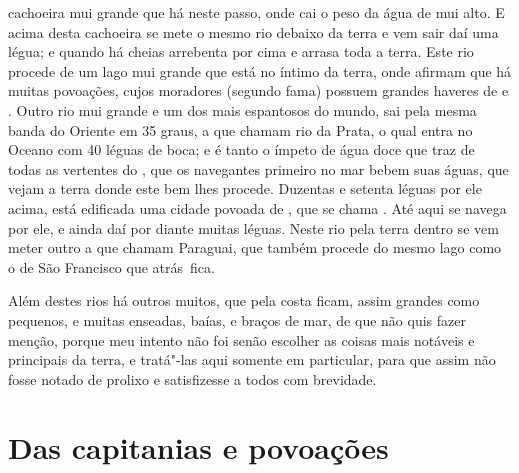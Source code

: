 cachoeira mui grande que há neste passo, onde cai o peso da água de mui
alto. E acima desta cachoeira se mete o mesmo rio debaixo da terra e
vem sair daí uma légua; e quando há cheias arrebenta por cima e arrasa
toda a terra. Este rio procede de um lago mui grande que está no íntimo
da terra, onde afirmam que há muitas povoações, cujos moradores
(segundo fama) possuem grandes haveres de  e . Outro rio
mui grande e um dos mais espantosos do mundo, sai pela mesma banda do
Oriente em 35 graus, a que chamam rio da Prata, o qual					%
entra no Oceano com 40 léguas de boca; e é tanto o ímpeto de água
doce que traz de todas as vertentes do , que os navegantes primeiro no mar
bebem suas águas, que vejam a terra donde este bem lhes procede.
Duzentas e setenta léguas por ele acima, está edificada uma cidade
povoada de , que se chama .  Até aqui se navega por
ele, e ainda daí  por diante muitas léguas. Neste rio pela terra dentro
se vem meter outro a que chamam Paraguai, que também procede do mesmo			%
lago como o de São Francisco que \mbox{atrás fica.}

Além destes rios há outros muitos, que pela costa ficam, assim grandes
como pequenos, e muitas enseadas, baías, e braços de mar, de que não
quis fazer menção, porque meu intento não foi senão escolher as coisas
mais notáveis e principais da terra, e tratá"-las aqui somente em
particular, para que assim não fosse notado de prolixo e satisfizesse a
todos com brevidade.									

\chapter[Das \indice{capitanias} e povoações]{Das capitanias e
povoações}

